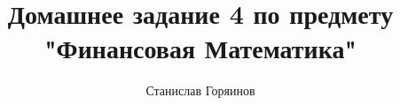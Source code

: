 

\date{}
\title{Домашнее задание 4 по предмету "Финансовая Математика"}
\author{Станислав Горяинов}


\maketitle




